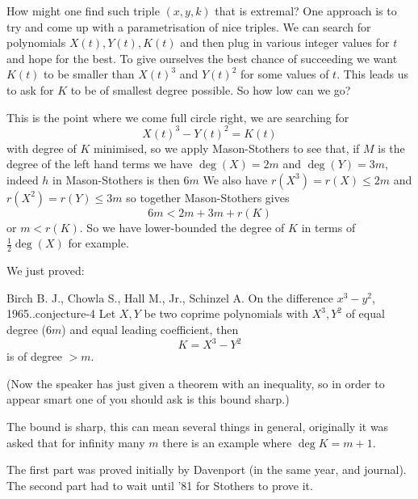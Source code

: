 \documentclass[10pt,]{book}
\numberwithin{equation}{section}
\newcommand{\lt}{<}
\newcommand{\gt}{>}
\begin{document}
\hypertarget{p-718}{}%
How might one find such triple \((x,y,k)\) that is extremal? One approach is to try and come up with a parametrisation of nice triples. We can search for polynomials \(X(t),Y(t), K(t)\) and then plug in various integer values for \(t\) and hope for the best. To give ourselves the best chance of succeeding we want \(K(t)\) to be smaller than \(X(t)^3\) and \(Y(t)^2\) for some values of \(t\). This leads us to ask for \(K\) to be of smallest degree possible. So how low can we go?%
\par
\hypertarget{p-719}{}%
This is the point where we come full circle right, we are searching for%
\begin{equation*}
X(t)^3 - Y(t)^2 = K(t)
\end{equation*}
with degree of \(K\) minimised, so we apply Mason-Stothers to see that, if \(M\) is the degree of the left hand terms we have \(\deg(X) = 2m\) and \(\deg (Y) = 3m\), indeed \(h\) in Mason-Stothers is then \(6m\) We also have \(r(X^3) = r(X) \le 2m\) and \(r(X^2) = r(Y) \le 3m\) so together Mason-Stothers gives%
\begin{equation*}
6m \lt 2m + 3m + r(K)
\end{equation*}
or \(m \lt r(K)\). So we have lower-bounded the degree of \(K\) in terms of \(\frac 12 \deg(X)\) for example.%
\par
\hypertarget{p-720}{}%
We just proved:%
\begin{conjecture}{Birch B. J., Chowla S., Hall M., Jr., Schinzel A. On the difference \(x^3 - y^2\), 1965..}{}{conjecture-4}%
\hypertarget{p-721}{}%
Let \(X, Y\) be two coprime polynomials with \(X^3,Y^2\) of equal degree (\(6m\)) and equal leading coefficient, then%
\begin{equation*}
K = X^3 - Y^2
\end{equation*}
is of degree \(\gt m\).%
\par
\hypertarget{p-722}{}%
(Now the speaker has just given a theorem with an inequality, so in order to appear smart one of you should ask is this bound sharp.)%
\par
\hypertarget{p-723}{}%
The bound is sharp, this can mean several things in general, originally it was asked that for infinity many \(m\) there is an example where \(\deg K = m + 1\).%
\end{conjecture}
\hypertarget{p-724}{}%
The first part was proved initially by Davenport (in the same year, and journal). The second part had to wait until '81 for Stothers to prove it.%
\par
\hypertarget{p-725}{}%
\end{document}

